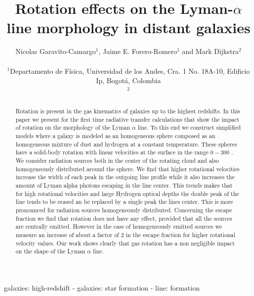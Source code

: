 \documentclass[usenatbib]{mn2e}
\newcommand{\kms}{{\ifmmode{{\mathrm{\,km\ s}^{-1}}}\else{\,km~s$^{-1}$}\fi}}
\begin{document}
\title[Rotation in the Lyman-$\alpha$ line]{Rotation effects on the
  Lyman-$\alpha$ line morphology in distant galaxies}
\author[Garavito-Camargo, Forero-Romero \& Dijkstra]{
\parbox[t]{\textwidth}{\raggedright 
  Nicolas Garavito-Camargo$^{1}$,
  Jaime E. Forero-Romero$^{1}$ and 
  Mark Dijkstra$^2$
}
\vspace*{6pt}\\
$^{1}$Departamento de F\'{i}sica, Universidad de los Andes, Cra. 1
No. 18A-10, Edificio Ip, Bogot\'a, Colombia \\
$^2$
}
\maketitle

\begin{abstract}
Rotation is present in the gas kinematics of galaxies up to the
highest redshifts. In this paper we present for the first time
radiative transfer calculations that show the impact of rotation on
the morphology of the Lyman $\alpha$ line. To this end we construct
simplified models where a galaxy is modeled as an homogeneous sphere
composed as an homogeneous mixture of dust and hydrogen at a constant
temperature. These spheres have a solid-body rotation with linear
velocities at the surface in the range $0-300$ \kms. We consider
radiation sources both in the center of the rotating cloud and also
homogeneously distributed around the sphere. We find that higher
rotational velocities increase the width of each peak in the outgoing
line profile while it also increases the amount of Lyman alpha photons
escaping in the line center. This trends makes that for high
rotational velocities and large Hydrogen optical depths the double
peak of the line tends to be erased an be replaced by a single peak the
lines center. This is more pronounced for radiation sources
homogeneously distributed. Concerning the escape fraction we find that
rotation does not have any effect, provided that all the sources are
centrally emitted. However in the case of homogeneously emitted
sources we measure an increase of about a factor of $2$ in the escape
fraction for higher rotational velocity values. 
Our work shows clearly that gas rotation has a non negligible impact
on the shape of the Lyman $\alpha$ line. 
\end{abstract}
\begin{keywords}
galaxies: high-redshift - galaxies: star formation - line: formation
\end{keywords}
\end{document}
